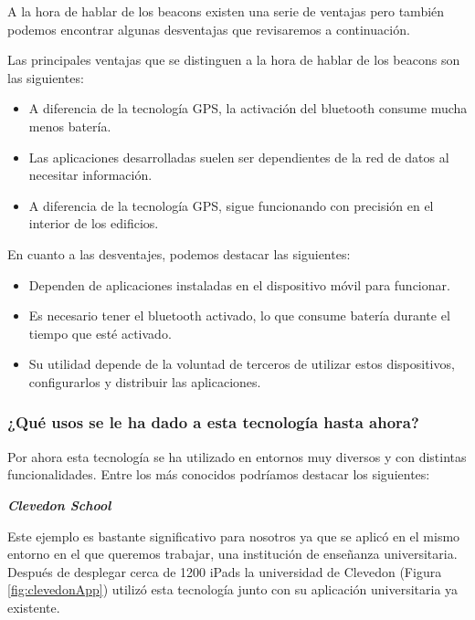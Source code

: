 A la hora de hablar de los beacons existen una serie de ventajas pero también podemos encontrar algunas desventajas que revisaremos a continuación. 

Las principales ventajas que se distinguen a la hora de hablar de los beacons son las siguientes: 

\begin{itemize}
\item A diferencia de la tecnología GPS, la activación del bluetooth consume mucha menos batería. 
\item Las aplicaciones desarrolladas suelen ser dependientes de la red de datos al necesitar información. 
\item A diferencia de la tecnología GPS, sigue funcionando con precisión en el interior de los edificios.
\end{itemize}

En cuanto a las desventajes, podemos destacar las siguientes:

\begin{itemize}
\item Dependen de aplicaciones instaladas en el dispositivo móvil para funcionar. 
\item Es necesario tener el bluetooth activado, lo que consume batería durante el tiempo que esté activado. 
\item Su utilidad depende de la voluntad de terceros de utilizar estos dispositivos, configurarlos y distribuir las aplicaciones.
\end{itemize}

\subsubsection{¿Qué usos se le ha dado a esta tecnología hasta ahora?}

Por ahora esta tecnología se ha utilizado en entornos muy diversos y con distintas funcionalidades. Entre los más conocidos podríamos destacar los siguientes: 

\vspace{5mm}

\textsl{\textbf{{Clevedon School}}}

\vspace{2mm}

Este ejemplo es bastante significativo para nosotros ya que se aplicó en el mismo entorno en el que queremos trabajar, una institución de enseñanza universitaria. Después de desplegar cerca de 1200 iPads  la universidad de Clevedon (Figura \ref{fig:clevedonApp}) utilizó esta tecnología junto con su aplicación universitaria ya existente. 


